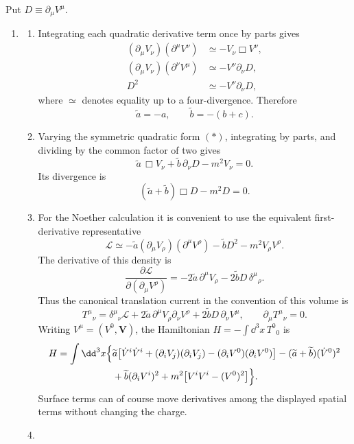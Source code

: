 \begin{enumerate}
Put \(D\equiv\partial_\mu V^\mu\).
\begin{enumerate}
\item
\begin{enumerate}
\renewcommand{\labelenumiii}{(\roman{enumiii})}
\item
Integrating each quadratic derivative term once by parts gives
\[
\begin{split}
 (\partial_\mu V_\nu)(\partial^\mu V^\nu)
 &\simeq -V_\nu\Box V^\nu,\\
 (\partial_\mu V_\nu)(\partial^\nu V^\mu)
 &\simeq -V^\nu\partial_\nu D,\\
 D^2&\simeq -V^\nu\partial_\nu D,
\end{split}
\]
where \(\simeq\) denotes equality up to a four-divergence.  Therefore
\[
 \boxed{\widetilde a=-a,\qquad
        \widetilde b=-(b+c)}.
\]
\item
Varying the symmetric quadratic form \((*)\), integrating by parts,
and dividing by the common factor of two gives
\[
 \boxed{
 \widetilde a\,\Box V_\nu
 +\widetilde b\,\partial_\nu D
 -m^2V_\nu=0.}
\]
Its divergence is
\[
 (\widetilde a+\widetilde b)\Box D-m^2D=0.
\]
\item
For the Noether calculation it is convenient to use the equivalent
first-derivative representative
\[
 \mathcal L\simeq
 -\widetilde a(\partial_\mu V_\rho)(\partial^\mu V^\rho)
 -\widetilde bD^2-m^2V_\rho V^\rho.
\]
The derivative of this density is
\[
 \frac{\partial\mathcal L}
 {\partial(\partial_\mu V^\rho)}
 =-2\widetilde a\,\partial^\mu V_\rho
  -2\widetilde bD\,\delta^\mu{}_{\rho}.
\]
Thus the canonical translation current in the convention of this
volume is
\[
 T^\mu{}_{\nu}
 =\delta^\mu{}_{\nu}\mathcal L
 +2\widetilde a\,\partial^\mu V_\rho\partial_\nu V^\rho
 +2\widetilde bD\,\partial_\nu V^\mu,
 \qquad \partial_\mu T^\mu{}_{\nu}=0.
\]
Writing \(V^\mu=(V^0,\mathbf V)\), the Hamiltonian
\(H=-\int \dd^3x\,T^0{}_0\) is
\[
\begin{split}
 H=\int \dd^3x\Bigl\{&
 \widetilde a\bigl[
   \dot V^i\dot V^i+(\partial_iV_j)(\partial_iV_j)
   -(\partial_iV^0)(\partial_iV^0)\bigr]
 -(\widetilde a+\widetilde b)(\dot V^0)^2\\
 &+\widetilde b(\partial_iV^i)^2
 +m^2\bigl[V^iV^i-(V^0)^2\bigr]\Bigr\}.
\end{split}
\]
Surface terms can of course move derivatives among the displayed
spatial terms without changing the charge.
\item

\end{enumerate}
\end{enumerate}
\end{enumerate}
